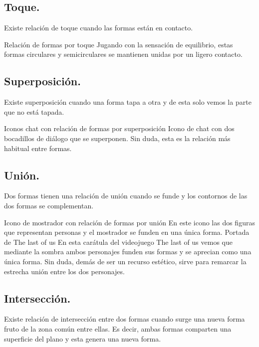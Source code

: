 \documentclass[
  16pt,
]{krantz}
\theoremstyle{definition}
\theoremstyle{definition}
\theoremstyle{definition}
\theoremstyle{definition}
\theoremstyle{remark}
\begin{document}
\hypertarget{toque.}{%
\subsection{Toque.}\label{toque.}}

Existe relación de toque cuando las formas están en contacto.

Relación de formas por toque
Jugando con la sensación de equilibrio, estas formas circulares y semicirculares se mantienen unidas por un ligero contacto.

\hypertarget{superposiciuxf3n.}{%
\subsection{Superposición.}\label{superposiciuxf3n.}}

Existe superposición cuando una forma tapa a otra y de esta solo vemos la parte que no está tapada.

Iconos chat con relación de formas por superposición
Icono de chat con dos bocadillos de diálogo que se superponen. Sin duda, esta es la relación más habitual entre formas.

\hypertarget{uniuxf3n.}{%
\subsection{Unión.}\label{uniuxf3n.}}

Dos formas tienen una relación de unión cuando se funde y los contornos de las dos formas se complementan.

Icono de mostrador con relación de formas por unión
En este icono las dos figuras que representan personas y el mostrador se funden en una única forma.
Portada de The last of us
En esta carátula del videojuego The last of us vemos que mediante la sombra ambos personajes funden sus formas y se aprecian como una única forma. Sin duda, demás de ser un recurso estético, sirve para remarcar la estrecha unión entre los dos personajes.

\hypertarget{intersecciuxf3n.}{%
\subsection{Intersección.}\label{intersecciuxf3n.}}

Existe relación de intersección entre dos formas cuando surge una nueva forma fruto de la zona común entre ellas. Es decir, ambas formas comparten una superficie del plano y esta genera una nueva forma.
\end{document}

